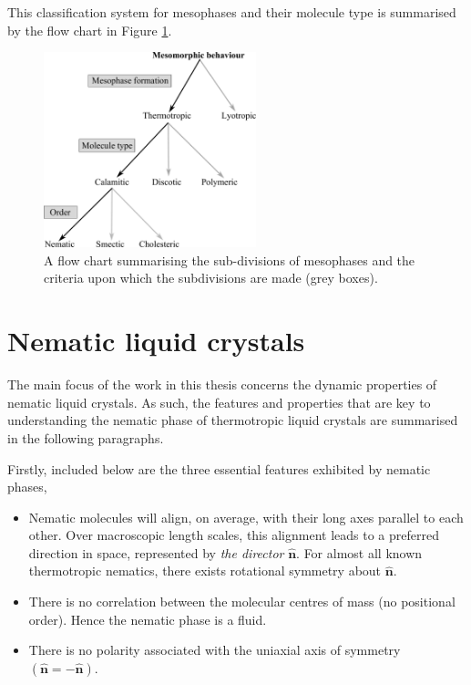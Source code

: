 This classification system for mesophases and their molecule type is summarised by the flow chart in Figure \ref{fig:flow_chart}.

\begin{figure}
\begin{center}
\includegraphics[width=0.55\textwidth]{figures/introduction/flow_chart.pdf}
\end{center}
\caption[Mesophase sub-division flow chart]{\label{fig:flow_chart}A flow chart summarising the sub-divisions of mesophases and the criteria upon which the subdivisions are made (grey boxes).}
\begin{center}
\end{center}
\end{figure}

\section{Nematic liquid crystals}
\label{sec:nematic_mesophase}
The main focus of the work in this thesis concerns the dynamic properties of nematic liquid crystals. As such, the features and properties that are key to understanding the nematic phase of thermotropic liquid crystals are summarised in the following paragraphs.

Firstly, included below are the three essential features exhibited by nematic phases,

\begin{itemize}
\item Nematic molecules will align, on average, with their long axes parallel to each other. Over macroscopic length scales, this alignment leads to a preferred direction in space, represented by \textit{the director} $\hat{\bm{n}}$. For almost all known thermotropic nematics, there exists rotational symmetry about $\hat{\bm{n}}$.
\item There is no correlation between the molecular centres of mass (no positional order). Hence the nematic phase is a fluid.
\item There is no polarity associated with the uniaxial axis of symmetry $\left(\hat{\bm{n}}=-\hat{\bm{n}}\right)$.
\end{itemize}

